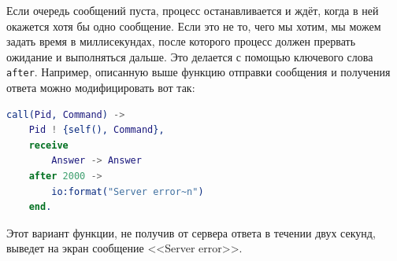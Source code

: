 \documentclass[
  paper=a4,
  fontsize=14pt,
  openany,
  appendixprefix=true
]{scrbook}
\begin{document}
Если очередь сообщений пуста, процесс останавливается и ждёт, когда в ней окажется хотя бы одно сообщение. Если это не то, чего мы хотим, мы можем задать время в миллисекундах, после которого процесс должен прервать ожидание и выполняться дальше. Это делается с помощью ключевого слова \lstinline{after}. Например, описанную выше функцию отправки сообщения и получения ответа можно модифицировать вот так:

\begin{lstlisting}[language=erlang]
call(Pid, Command) ->
    Pid ! {self(), Command},
    receive
        Answer -> Answer
    after 2000 ->
        io:format("Server error~n")
    end.
\end{lstlisting}

Этот вариант функции, не получив от сервера ответа в течении двух секунд, выведет на экран сообщение <<Server error>>.
\end{document}
